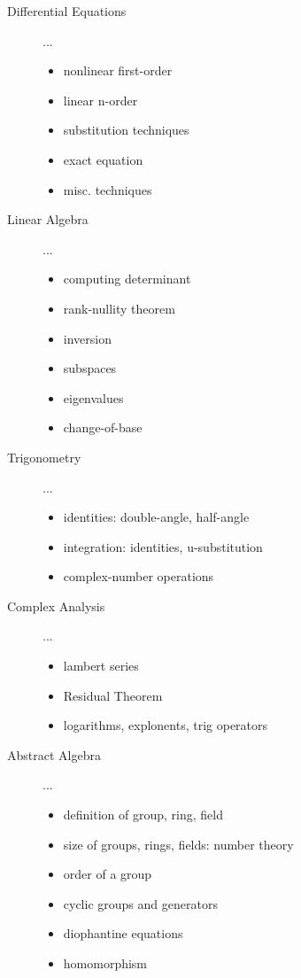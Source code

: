 \documentclass[10pt,twoside,a4paper]{article}
\begin{document}
\begin{description}
  \item[Differential Equations] ...
    \begin{itemize}
      \item nonlinear first-order
      \item linear n-order
      \item substitution techniques
      \item exact equation
      \item misc. techniques
    \end{itemize}

  \item[Linear Algebra] ...
    \begin{itemize}
      \item computing determinant
      \item rank-nullity theorem
      \item inversion
      \item subspaces
      \item eigenvalues
      \item change-of-base
    \end{itemize}

  \pagebreak

  \item[Trigonometry] ...
    \begin{itemize}
      \item identities: double-angle, half-angle
      \item integration: identities, u-substitution
      \item complex-number operations
    \end{itemize}

  \item[Complex Analysis] ...
    \begin{itemize}
      \item lambert series
      \item Residual Theorem
      \item logarithms, explonents, trig operators
    \end{itemize}

  \item[Abstract Algebra] ...
    \begin{itemize}
      \item definition of group, ring, field
      \item size of groups, rings, fields: number theory
      \item order of a group
      \item cyclic groups and generators
      \item diophantine equations
      \item homomorphism
    \end{itemize}


\end{description}
\end{document}
